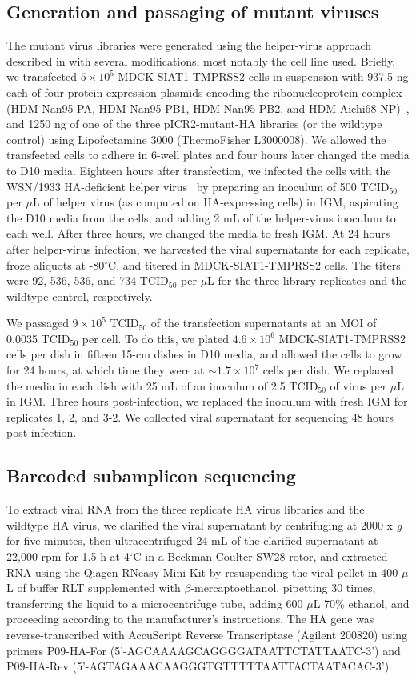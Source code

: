 \documentclass[9pt,twocolumn,twoside]{pnas-new}
\begin{document}
{\subsection*{Generation and passaging of mutant viruses}
The mutant virus libraries were generated using the helper-virus approach described in \cite{doud2016accurate} with several modifications, most notably the cell line used.
Briefly, we transfected $5 \times 10^5$ MDCK-SIAT1-TMPRSS2 cells in suspension with 937.5 ng each of four protein expression plasmids encoding the ribonucleoprotein complex (HDM-Nan95-PA, HDM-Nan95-PB1, HDM-Nan95-PB2, and HDM-Aichi68-NP)~\cite{gong2013stability}, and 1250 ng of one of the three pICR2-mutant-HA libraries (or the wildtype control) using Lipofectamine 3000 (ThermoFisher L3000008).
We allowed the transfected cells to adhere in 6-well plates and four hours later changed the media to D10 media.
Eighteen hours after transfection, we infected the cells with the WSN/1933 HA-deficient helper virus~\cite{doud2016accurate} by preparing an inoculum of 500 TCID$_{50}$ per $\mu$L of helper virus (as computed on HA-expressing cells) in IGM, aspirating the D10 media from the cells, and adding 2 mL of the helper-virus inoculum to each well.
After three hours, we changed the media to fresh IGM.
At 24 hours after helper-virus infection, we harvested the viral supernatants for each replicate, froze aliquots at -80$^{\circ}$C, and titered in MDCK-SIAT1-TMPRSS2 cells.
The titers were 92, 536, 536, and 734 TCID$_{50}$ per $\mu$L for the three library replicates and the wildtype control, respectively.

We passaged $9 \times 10^5$ TCID$_{50}$ of the transfection supernatants at an MOI of 0.0035 TCID$_{50}$ per cell.
To do this, we plated $4.6 \times 10^6$ MDCK-SIAT1-TMPRSS2 cells per dish in fifteen 15-cm dishes in D10 media, and allowed the cells to grow for 24 hours, at which time they were at $\sim 1.7 \times 10^7$ cells per dish.
We replaced the media in each dish with 25 mL of an inoculum of 2.5 TCID$_{50}$ of virus per $\mu$L in IGM.
Three hours post-infection, we replaced the inoculum with fresh IGM for replicates 1, 2, and 3-2.
We collected viral supernatant for sequencing 48 hours post-infection.

\subsection*{Barcoded subamplicon sequencing}
To extract viral RNA from the three replicate HA virus libraries and the wildtype HA virus, we clarified the viral supernatant by centrifuging at 2000 x \textit{g} for five minutes, then ultracentrifuged 24 mL of the clarified supernatant at 22,000 rpm for 1.5 h at 4$^{\circ}$C in a Beckman Coulter SW28 rotor, and extracted RNA using the Qiagen RNeasy Mini Kit by resuspending the viral pellet in 400 $\mu$L of buffer RLT supplemented with $\beta$-mercaptoethanol, pipetting 30 times, transferring the liquid to a microcentrifuge tube, adding 600 $\mu$L 70\% ethanol, and proceeding according to the manufacturer's instructions.
The HA gene was reverse-transcribed with AccuScript Reverse Transcriptase (Agilent 200820) using primers P09-HA-For (5'-AGCAAAAGCAGGGGATAATTCTATTAATC-3') and P09-HA-Rev (5'-AGTAGAAACAAGGGTGTTTTTAATTACTAATACAC-3').

}
\end{document}
